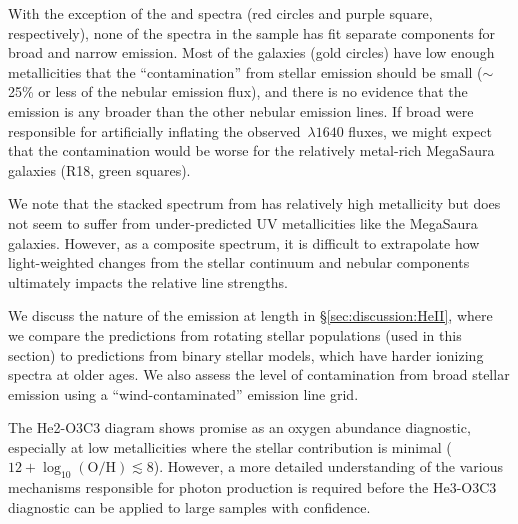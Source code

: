 \documentclass[preprint2]{aastex62}
\newcommand{\heii}{\ion{He}{2}}
\newcommand{\logten}{\ensuremath{\log_{10}}}
\newcommand{\logOH}{\ensuremath{\logten (\mathrm{O}/\mathrm{H})}\xspace}
\newcommand{\mage}{{\sc Meg}a{\sc S}a{\sc ura}\xspace}
\begin{document}
With the exception of the \citet{Senchyna+2017} and \citet{Berg+2018} spectra (red circles and purple square, respectively), none of the spectra in the sample has fit separate components for broad and narrow  emission. Most of the \citet{Berg+2016} galaxies (gold circles) have low enough metallicities that the ``contamination'' from stellar emission should be small (${\sim}$25\% or less of the nebular emission flux), and there is no evidence that the  emission is any broader than the other nebular emission lines. If broad  were responsible for artificially inflating the observed \heii$\,\lambda1640$ fluxes, we might expect that the contamination would be worse for the relatively metal-rich \mage galaxies (R18, green squares).

We note that the stacked spectrum from \citet{Steidel+2016} has relatively high metallicity but does not seem to suffer from under-predicted UV metallicities like the \mage galaxies. However, as a composite spectrum, it is difficult to extrapolate how light-weighted changes from the stellar continuum and nebular components ultimately impacts the relative line strengths.

We discuss the nature of the  emission at length in \S\ref{sec:discussion:HeII}, where we compare the predictions from rotating stellar populations (used in this section) to predictions from binary stellar models, which have harder ionizing spectra at older ages. We also assess the level of contamination from broad stellar emission using a ``wind-contaminated'' emission line grid.

The He2-O3C3 diagram shows promise as an oxygen abundance diagnostic, especially at low metallicities where the stellar contribution is minimal ($12+\logOH \lesssim 8$). However, a more detailed understanding of the various mechanisms responsible for  photon production is required before the He3-O3C3 diagnostic can be applied to large samples with confidence.
\end{document}
